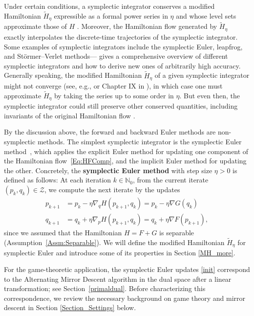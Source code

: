 \documentclass[11pt]{article}
\newcommand{\Z}{\mathcal{Z}}
\newcommand{\N}{\mathbb{N}}
\begin{document}
Under certain conditions, a symplectic integrator conserves a modified Hamiltonian $\widetilde{H}_{\eta}$ expressible as a formal power series in $\eta$ and whose level sets approximate those of $H$ \citep{Yoshida1990,Yoshida1993,Hairer2006}. Moreover, the Hamiltonian flow generated by $\widetilde{H}_{\eta}$ exactly interpolates the discrete-time trajectories of the symplectic integrator. Some examples of symplectic integrators include the symplectic Euler, leapfrog, and Störmer–Verlet methods---\citep[Chapter VI]{Hairer2006} gives a comprehensive overview of different symplectic integrators and how to derive new ones of arbitrarily high accuracy. Generally speaking, the modified Hamiltonian $\widetilde{H}_{\eta}$ of a given symplectic integrator might not converge (see, e.g., \cite{Field2003} or Chapter IX in \cite{Hairer2006}), in which case one must approximate $\widetilde{H}_{\eta}$ by taking the series up to some order in $\eta$. But even then, the symplectic integrator could still preserve other conserved quantities, including invariants of the original Hamiltonian flow \citep{Alsallami2018,ohsawa2023preservation}. 

By the discussion above, the forward and backward Euler methods are non-symplectic methods. The simplest symplectic integrator is the symplectic Euler method~\citep{Channell1990,Yoshida1993}, 
which applies the explicit Euler method for updating one component of the Hamiltonian flow~\eqref{Eq:HFComp}, and the implicit Euler method for updating the other.
Concretely, the {\bf symplectic Euler method} with step size $\eta > 0$ is defined as follows: At each iteration $k \in \N_0$, from the current iterate $(p_k, q_k) \in \Z$, we compute the next iterate by the updates
\begin{subequations}\label{init}
\begin{align}
        p_{k+1} &=p_{k}-\eta \nabla_{q}H\left(p_{k+1},q_{k}\right)= p_{k}-\eta\nabla G\left(q_{k}\right) \label{Eq:SymEuler-p} \\ 
        q_{k+1} &=q_{k}+\eta\nabla_{p}H\left(p_{k+1},q_{k}\right)= q_{k}+\eta\nabla F\left(p_{k+1}\right), \label{Eq:SymEuler-q}
\end{align}
\end{subequations}
since we assumed that the Hamiltonian $H = F+G$ is separable (Assumption~\ref{Assm:Separable}). We will define the modified Hamiltonian $\widetilde{H}_{\eta}$ for symplectic Euler and introduce some of its properties in Section \ref{MH_more}.

For the game-theoretic application, the symplectic Euler updates \eqref{init} correspond to the Alternating Mirror Descent algorithm in the dual space after a linear transformation; see Section~\ref{primaldual}. Before characterizing this correspondence, we review the necessary background on game theory and mirror descent in Section \ref{Section_Settings} below.    
\end{document}
